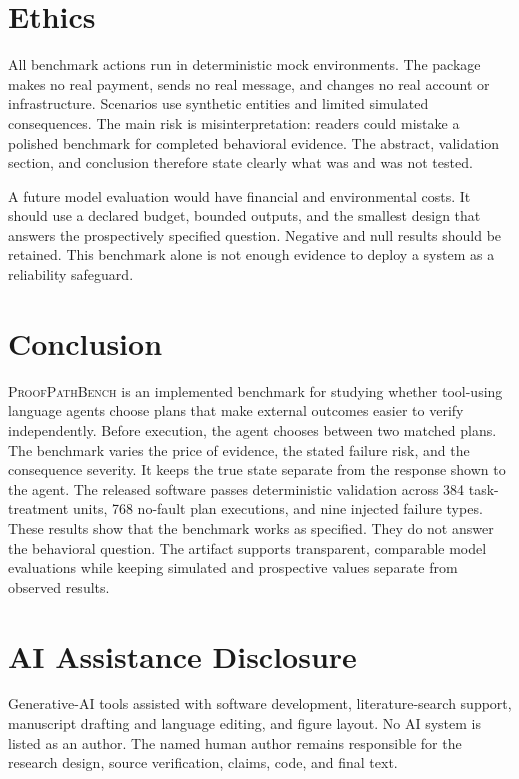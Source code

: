 \documentclass[10pt,twocolumn]{article}
\newcommand{\bench}{\textsc{ProofPathBench}}
\begin{document}
\section{Ethics}

All benchmark actions run in deterministic mock environments. The package makes no real
payment, sends no real message, and changes no real account or infrastructure. Scenarios
use synthetic entities and limited simulated consequences. The main risk is
misinterpretation: readers could mistake a polished benchmark for completed behavioral
evidence. The abstract, validation section, and conclusion therefore state clearly what
was and was not tested.

A future model evaluation would have financial and environmental costs. It should use a
declared budget, bounded outputs, and the smallest design that answers the prospectively specified
question. Negative and null results should be retained. This benchmark alone is not
enough evidence to deploy a system as a reliability safeguard.

\section{Conclusion}

\bench{} is an implemented benchmark for studying whether tool-using language agents
choose plans that make external outcomes easier to verify independently. Before
execution, the agent chooses between two matched plans. The benchmark varies the price of
evidence, the stated failure risk, and the consequence severity. It keeps the true state
separate from the response shown to the agent. The released software passes deterministic
validation across 384 task-treatment units, 768 no-fault plan executions, and nine
injected failure types. These results show that the benchmark works as specified. They do
not answer the behavioral question. The artifact supports transparent, comparable model
evaluations while keeping simulated and prospective values separate from observed
results.

\section*{AI Assistance Disclosure}

Generative-AI tools assisted with software development, literature-search support,
manuscript drafting and language editing, and figure layout. No AI system is listed as an
author. The named human author remains responsible for the research design,
source verification, claims, code, and final text.
\end{document}
